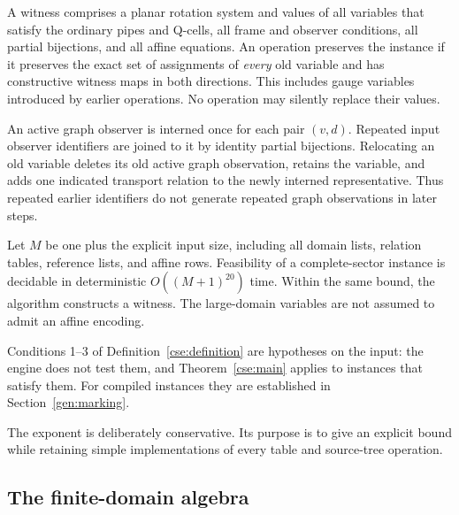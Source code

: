 A witness comprises a planar rotation system and values of all variables
that satisfy the ordinary pipes and Q-cells, all frame and observer
conditions, all partial bijections, and all affine equations. An operation
preserves the instance if it preserves the exact set of assignments of
\emph{every} old variable and has constructive witness maps in both
directions. This includes gauge variables introduced by earlier
operations. No operation may silently replace their values.

An active graph observer is interned once for each pair $(v,d)$.
Repeated input observer identifiers are joined to it by identity partial
bijections. Relocating an old variable deletes its old active graph
observation, retains the variable, and adds one indicated transport
relation to the newly interned representative. Thus repeated earlier
identifiers do not generate repeated graph observations in later steps.

\begin{theorem}
\label{cse:main}
Let $M$ be one plus the explicit input size, including all domain lists,
relation tables, reference lists, and affine rows. Feasibility of a
complete-sector instance is decidable in deterministic
$O((M+1)^{20})$ time. Within the same bound, the algorithm constructs a witness.  The
large-domain variables are not assumed to admit an affine encoding.
\end{theorem}

Conditions 1--3 of Definition~\ref{cse:definition} are hypotheses on the
input: the engine does not test them, and Theorem~\ref{cse:main} applies
to instances that satisfy them. For compiled instances they are
established in Section~\ref{gen:marking}.

The exponent is deliberately conservative. Its purpose is to give an
explicit bound while retaining simple implementations of every table and
source-tree operation.

\subsection{The finite-domain algebra}

